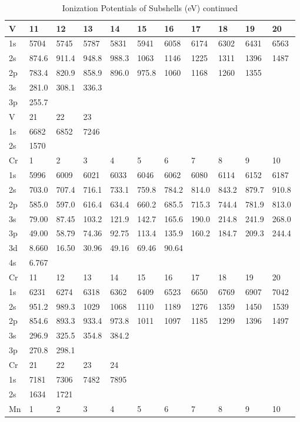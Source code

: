 \begin{table}
\caption{Ionization Potentials of Subshells (eV) continued}
\begin{tabular}{lllllllllll}
\hline
V&   11&  12& 13&  14&  15&  16&  17&  18&  19&  20\\
\hline
1s&  5704&  5745&  5787&  5831&  5941&
6058&  6174&  6302&  6431&  6563\\
2s& 874.6& 911.4& 948.8& 988.3& 1063& 1146& 1225&
1311&  1396&  1487\\
2p& 783.4& 820.9& 858.9& 896.0& 975.8&  1060&  1168&  1260&  1355\\
3s&
281.0& 308.1& 336.3\\
3p& 255.7\\
\hline
V&   21&  22&  23\\
1s&  6682&  6852&  7246\\
2s&  1570\\
\hline
Cr&
1&   2&   3&   4&   5&   6&   7&   8&   9&  10\\
\hline
1s&  5996&  6009&  6021&  6033&  6046&  6062&
6080&  6114&  6152&  6187\\
2s& 703.0& 707.4& 716.1& 733.1& 759.8& 784.2& 814.0& 843.2&
879.7& 910.8\\
2p& 585.0& 597.0& 616.4& 634.4& 660.2& 685.5& 715.3& 744.4& 781.9& 813.0\\
3s&
79.00& 87.45& 103.2& 121.9& 142.7& 165.6& 190.0& 214.8& 241.9& 268.0\\
3p& 49.00& 58.79&
74.36& 92.75& 113.4& 135.9& 160.2& 184.7& 209.3& 244.4\\
3d& 8.660& 16.50& 30.96& 49.16&
69.46& 90.64\\
4s& 6.767\\
\hline
Cr&  11&  12&  13&  14&  15&  16&  17&  18&  19&  20\\
1s&  6231&  6274&
6318&  6362&  6409&  6523&  6650&  6769&  6907&  7042\\
2s& 951.2& 989.3&  1029&  1068&
1110&  1189&  1276&  1359&  1450&  1539\\
2p& 854.6& 893.3& 933.4& 973.8& 1011& 1097&
1185&  1299&  1396&  1497\\
3s& 296.9& 325.5& 354.8& 384.2\\
3p& 270.8& 298.1\\
\hline
Cr&  21&  22&
23&  24\\
\hline
1s&  7181&  7306&  7482&  7895\\
2s&  1634&  1721\\
\hline
Mn&   1&   2&   3&   4&   5&   6&
7&   8&   9&  10\\

\end{tabular}
\end{table}
